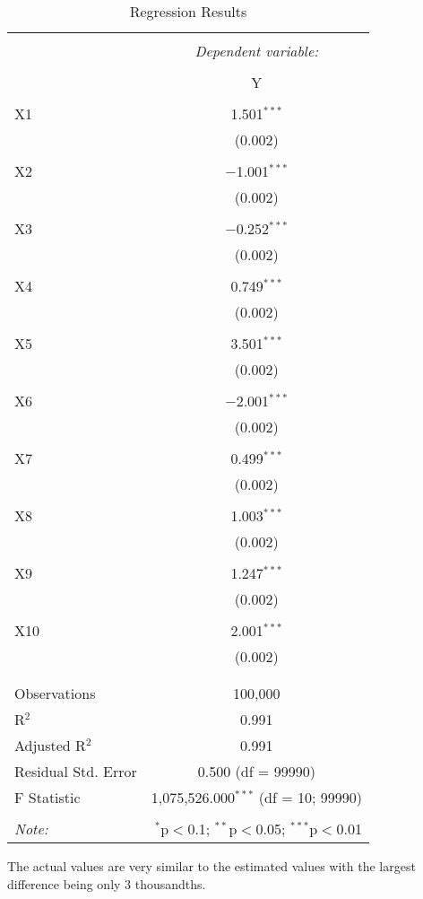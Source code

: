 \documentclass{article}
\begin{document}
\begin{table}[!htbp] \centering 
  \caption{Regression Results} 
  \label{} 
\begin{tabular}{@{\extracolsep{5pt}}lc} 
\\[-1.8ex]\hline 
\hline \\[-1.8ex] 
 & \multicolumn{1}{c}{\textit{Dependent variable:}} \\ 
\cline{2-2} 
\\[-1.8ex] & Y \\ 
\hline \\[-1.8ex] 
 X1 & 1.501$^{***}$ \\ 
  & (0.002) \\ 
  & \\ 
 X2 & $-$1.001$^{***}$ \\ 
  & (0.002) \\ 
  & \\ 
 X3 & $-$0.252$^{***}$ \\ 
  & (0.002) \\ 
  & \\ 
 X4 & 0.749$^{***}$ \\ 
  & (0.002) \\ 
  & \\ 
 X5 & 3.501$^{***}$ \\ 
  & (0.002) \\ 
  & \\ 
 X6 & $-$2.001$^{***}$ \\ 
  & (0.002) \\ 
  & \\ 
 X7 & 0.499$^{***}$ \\ 
  & (0.002) \\ 
  & \\ 
 X8 & 1.003$^{***}$ \\ 
  & (0.002) \\ 
  & \\ 
 X9 & 1.247$^{***}$ \\ 
  & (0.002) \\ 
  & \\ 
 X10 & 2.001$^{***}$ \\ 
  & (0.002) \\ 
  & \\ 
\hline \\[-1.8ex] 
Observations & 100,000 \\ 
R$^{2}$ & 0.991 \\ 
Adjusted R$^{2}$ & 0.991 \\ 
Residual Std. Error & 0.500 (df = 99990) \\ 
F Statistic & 1,075,526.000$^{***}$ (df = 10; 99990) \\ 
\hline 
\hline \\[-1.8ex] 
\textit{Note:}  & \multicolumn{1}{r}{$^{*}$p$<$0.1; $^{**}$p$<$0.05; $^{***}$p$<$0.01} \\ 
\end{tabular} 
\end{table} 

The actual values are very similar to the estimated values with the largest difference being only 3 thousandths. 
\end{document}
